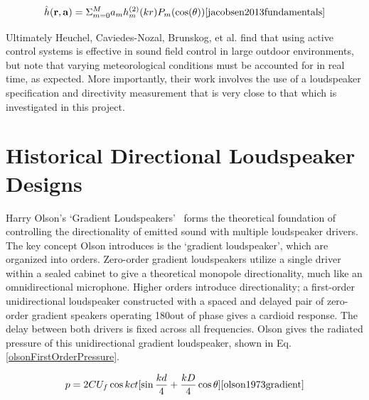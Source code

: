 \documentclass{report}
\newcommand{\matr}[1]{\mathbf{#1}} %
\begin{document}
        \begin{equation}
            \hat{h}(\matr{r},\matr{a}) = \Sigma_{m=0}^{M}a_m h_m^{(2)}(kr)P_m(\cos(\theta)) \cite{jacobsen2013fundamentals}
            \label{heuchelSpherical}
        \end{equation}

        Ultimately Heuchel, Caviedes-Nozal, Brunskog, et al. find that using active control systems is effective in sound field control in large outdoor environments, but note that varying meteorological conditions must be accounted for in real time, as expected.
        More importantly, their work involves the use of a loudspeaker specification and directivity measurement that is very close to that which is investigated in this project.

    \section{Historical Directional Loudspeaker Designs}

        Harry Olson's `Gradient Loudspeakers'~\cite{olson1973gradient} forms the theoretical foundation of controlling the directionality of emitted sound with multiple loudspeaker drivers.
        The key concept Olson introduces is the `gradient loudspeaker', which are organized into orders.
        Zero-order gradient loudspeakers utilize a single driver within a sealed cabinet to give a theoretical monopole directionality, much like an omnidirectional microphone.
        Higher orders introduce directionality; a first-order unidirectional loudspeaker constructed with a spaced and delayed pair of zero-order gradient speakers operating 180\degree\@ out of phase gives a cardioid response.
        The delay between both drivers is fixed across all frequencies.
        Olson gives the radiated pressure of this unidirectional gradient loudspeaker, shown in Eq.\ref{olsonFirstOrderPressure}.

        \begin{equation}
            p = 2CU_f\cos{kct}[\sin{\frac{kd}{4}+\frac{kD}{4}\cos{\theta}}]
            \label{olsonFirstOrderPressure}
            \cite{olson1973gradient}
        \end{equation}
\end{document}

